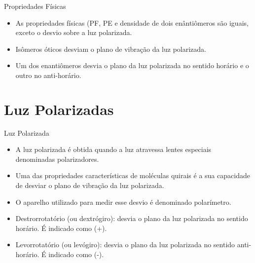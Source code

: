 \documentclass[presentation,professionalfonts,aspectratio=169]{beamer}
\begin{document}
\begin{frame}[label={sec:org83061bc}]{Propriedades Físicas}
\begin{itemize}
\item As propriedades físicas (PF, PE e densidade de dois enântiômeros são iguais, \alert{exceto} o desvio sobre a luz polarizada.
\item Isômeros óticos desviam o plano de vibração da luz polarizada.
\item Um dos enantiômeros desvia o plano da luz polarizada no sentido horário e o outro no anti-horário.
\end{itemize}
\end{frame}


\section{Luz Polarizadas}
\label{sec:org8a90708}

\begin{frame}[label={sec:org796a345}]{Luz Polarizada}
\begin{center}
\end{center}
\end{frame}

\begin{frame}[label={sec:orgd6b4aa3}]{}
\begin{itemize}
\item A luz polarizada é obtida quando a luz atravessa lentes especiais denominadas polarizadores.
\item Uma das propriedades características de moléculas quirais é a sua capacidade de desviar o plano de vibração da luz polarizada.
\item O aparelho utilizado para medir esse desvio é denominado \alert{polarímetro}.
\item \alert{Destrorrotatório (ou dextrógiro)}: desvia o plano da luz polarizada no sentido horário. É indicado como \alert{(+)}.
\item \alert{Levorrotatório (ou levógiro)}: desvia o plano da luz polarizada no sentido anti-horário. É indicado como \alert{(-)}.
\end{itemize}
\end{frame}
\end{document}
